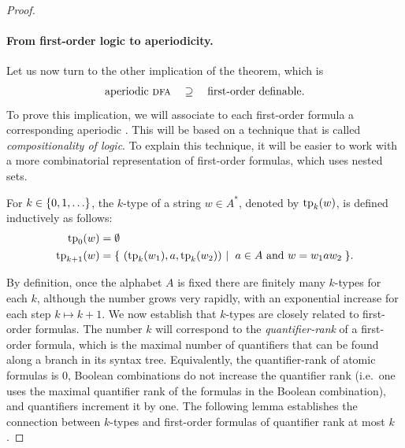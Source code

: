 \begin{proof}
    \newcommand{\equivclass}[2]{#1_{/#2}}

    \paragraph*{From first-order logic to aperiodicity.}
    Let us now turn to the other implication of the theorem, which is 
    \begin{align*}
    \text{aperiodic \textsc{dfa}} \quad \supseteq \quad \text{first-order definable}.
    \end{align*}
    To prove this implication, we will associate to each first-order formula a corresponding aperiodic \dfa. This will be based on a technique that is called \emph{compositionality of logic}. 
    To explain this technique, it will be easier to work with a more combinatorial representation of first-order formulas, which uses nested sets.
    
    \begin{definition}[$k$-types]\label{def:k-types}
        For $k \in \{0,1,\ldots\}$, the $k$-type of a string $w \in A^*$, denoted by $\text{tp}_k(w)$, is defined inductively as follows:
    \begin{align*}
        \fotype_0(w) & = \emptyset \\
        \fotype_{k+1}(w) & = \setbuild{ (\fotype_k(w_1), a, \fotype_k(w_2))}{$a \in A$ and $w = w_1 a w_2$}.
    \end{align*}
    \end{definition}
By definition, once the alphabet $A$ is fixed there are finitely many $k$-types for each $k$, although the number grows very rapidly, with an exponential increase for each step $k \mapsto k+1$. We now establish that $k$-types are closely related to first-order formulas. The number $k$ will correspond to the  \emph{quantifier-rank} of a first-order formula, which is the  maximal number of quantifiers that can be found along a branch in its syntax tree. Equivalently, the quantifier-rank of atomic formulas is 0, Boolean combinations do not increase the quantifier rank (i.e.~one uses the maximal quantifier rank of the formulas in the Boolean combination), and quantifiers increment it by one. The following lemma establishes the connection between $k$-types and first-order formulas of quantifier rank at most $k$.



\end{proof}
